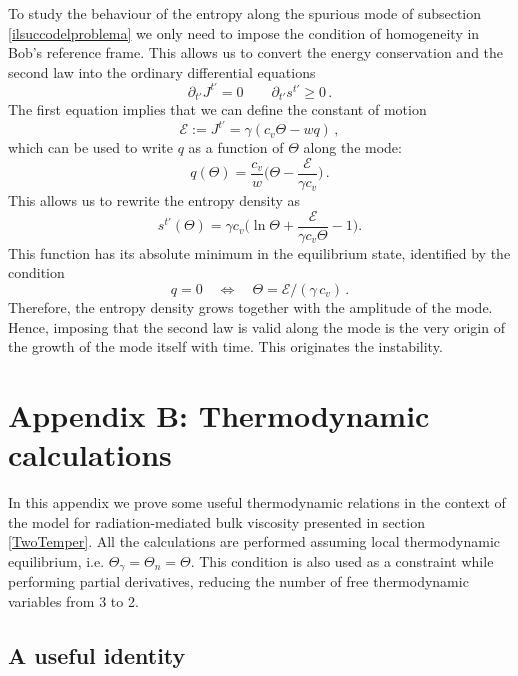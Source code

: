 \documentclass[a4paper, amsfonts, amssymb, amsmath, reprint, twocolumn, showkeys, nofootinbib]{revtex4-2}
\begin{document}
To study the behaviour of the entropy along the spurious mode of subsection \ref{ilsuccodelproblema} we only need to impose the condition of homogeneity in Bob's reference frame. This allows us to convert the energy conservation and the second law into the ordinary differential equations
\begin{equation}
\partial_{t'} J^{t'}=0   \quad \quad    \partial_{t'} s^{t'} \geq 0 \, .
\end{equation}
The first equation implies that we can define the constant of motion
\begin{equation}
\mathcal{E}:= J^{t'} = \gamma (c_v \Theta - wq) \, ,
\end{equation}
which can be used to write $q$ as a function of $\Theta$ along the mode:
\begin{equation}
q (\Theta) = \dfrac{c_v}{w} \bigg( \Theta - \dfrac{\mathcal{E}}{ \gamma c_v}  \bigg) \, .
\end{equation}
This allows us to rewrite the entropy density as
\begin{equation}
s^{t'}(\Theta) = \gamma c_v \bigg( \ln \Theta +\dfrac{\mathcal{E}}{\gamma c_v \Theta} -1  \bigg).
\end{equation}
This function has its absolute minimum in the equilibrium state, identified by the condition
\begin{equation}
q=0   \quad    \Longleftrightarrow   \quad   \Theta = {\mathcal{E}}/({\gamma \, c_v}) \, .
\end{equation}
Therefore, the entropy density grows together with the amplitude of the mode. Hence, imposing that the second law is valid along the mode is the very origin of the growth of the mode itself with time. This originates the instability.


\section{Appendix B: Thermodynamic calculations}

In this appendix we prove some useful thermodynamic relations in the context of the model for radiation-mediated bulk viscosity presented in section \ref{TwoTemper}. 
All the calculations are performed assuming local thermodynamic equilibrium, i.e.  $\Theta_\gamma = \Theta_n = \Theta$. This condition is also used as a constraint while performing partial derivatives, reducing the number of free thermodynamic variables from 3 to 2.

\subsection{A useful identity}\label{AppendB1}
\end{document}
